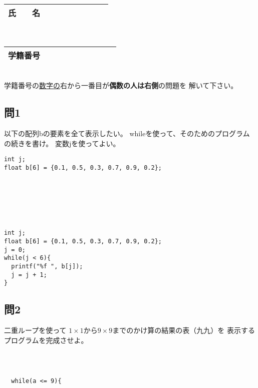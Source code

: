 \documentclass[a4j]{jarticle}
\begin{document}
\begin{multicols*}{2}
\noindent
\begin{tabular}[t]{|c|cccccccc|}\hline
氏　　名 & & & & & & & & \\ \hline
\end{tabular}\\
\begin{tabular}[t]{|c|c|c|c|c|c|c|c|c|c|}\hline
学籍番号 & & & & & & & & \\ \hline
\end{tabular}\\
学籍番号の\underline{数字の}右から一番目が{\bfseries 偶数の人は右側}の問題を
解いて下さい。
\vspace{-5ex}







\subsection*{問1}

以下の配列{\ttfamily b}の要素を全て表示したい。
{\ttfamily while}を使って、そのためのプログラムの続きを書け。
変数{\ttfamily j}を使ってよい。


\ifnum {}
\begin{verbatim}
int j;
float b[6] = {0.1, 0.5, 0.3, 0.7, 0.9, 0.2};







\end{verbatim}
\else
\begin{verbatim}
int j;
float b[6] = {0.1, 0.5, 0.3, 0.7, 0.9, 0.2};
j = 0;
while(j < 6){
  printf("%f ", b[j]);
  j = j + 1;
}
\end{verbatim}
\fi
\vspace{5cm}



\subsection*{問2}



二重ループを使って
$1\times1$から$9\times9$までのかけ算の結果の表（九九）を
表示するプログラムを完成させよ。


\ifnum {}
\begin{verbatim}



  while(a <= 9){




\end{verbatim}
\end{multicols*}
\end{document}
